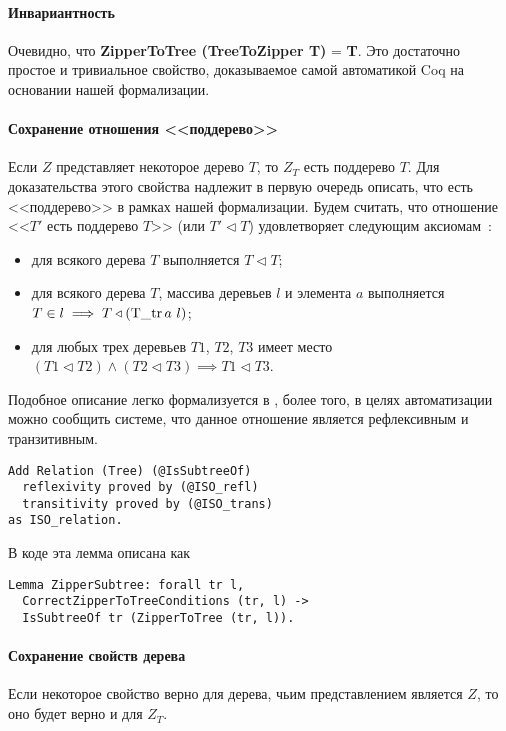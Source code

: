 \paragraph{Инвариантность}
Очевидно, что \textbf{ZipperToTree (TreeToZipper T)} = \textbf{T}. Это достаточно простое и тривиальное свойство, доказываемое самой автоматикой Coq на основании нашей формализации.

\paragraph{Сохранение отношения <<поддерево>>}
Если $Z$ представляет некоторое дерево $T$, то $Z_T$ есть поддерево $T$. Для доказательства этого свойства надлежит в первую очередь описать, что есть <<поддерево>> в рамках нашей формализации. Будем считать, что отношение <<$T'$ есть поддерево $T$>> (или $T' \triangleleft T$) удовлетворяет следующим аксиомам~\autocite{Okasaki1996, Cormen2002}:
\begin{itemize}
\item для всякого дерева $T$ выполняется $T \triangleleft T$;
\item для всякого дерева $T$, массива деревьев $l$ и элемента $a$ выполняется $T \in l \implies T \triangleleft (\operatorname{T\_tr} a \ l)$;
\item для любых трех деревьев $T1$, $T2$, $T3$ имеет место $(T1 \triangleleft T2) \wedge (T2 \triangleleft T3) \implies T1 \triangleleft T3$.
\end{itemize}

Подобное описание легко формализуется в \tcoq, более того, в целях автоматизации можно сообщить системе, что данное отношение является рефлексивным и транзитивным.

\begin{Verbatim}[fontsize=\small]
Add Relation (Tree) (@IsSubtreeOf)
  reflexivity proved by (@ISO_refl)
  transitivity proved by (@ISO_trans)
as ISO_relation.
\end{Verbatim}

В коде эта лемма описана как
\begin{Verbatim}[fontsize=\small]
Lemma ZipperSubtree: forall tr l,
  CorrectZipperToTreeConditions (tr, l) ->
  IsSubtreeOf tr (ZipperToTree (tr, l)).
\end{Verbatim}

\paragraph{Сохранение свойств дерева}
Если некоторое свойство верно для дерева, чьим представлением является $Z$, то оно будет верно и для $Z_T$. 

